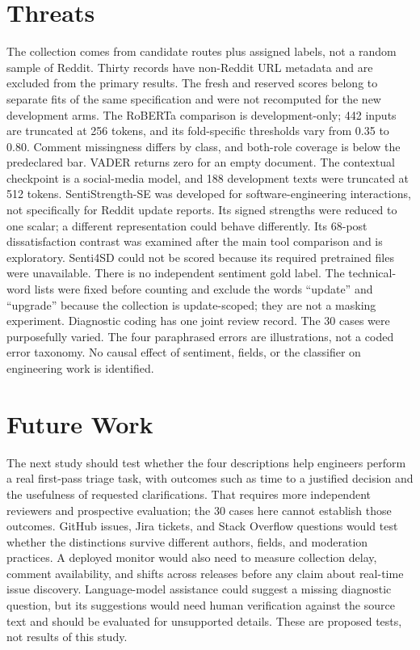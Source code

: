 \documentclass[conference,letterpaper]{IEEEtran}
\begin{document}
\section{Threats}
The collection comes from candidate routes plus assigned labels, not a random sample of Reddit. Thirty records have non-Reddit URL metadata and are excluded from the primary results. The fresh and reserved scores belong to separate fits of the same specification and were not recomputed for the new development arms. The RoBERTa comparison is development-only; 442 inputs are truncated at 256 tokens, and its fold-specific thresholds vary from 0.35 to 0.80. Comment missingness differs by class, and both-role coverage is below the predeclared bar. VADER returns zero for an empty document. The contextual checkpoint is a social-media model, and 188 development texts were truncated at 512 tokens. SentiStrength-SE was developed for software-engineering interactions, not specifically for Reddit update reports. Its signed strengths were reduced to one scalar; a different representation could behave differently. Its 68-post dissatisfaction contrast was examined after the main tool comparison and is exploratory. Senti4SD could not be scored because its required pretrained files were unavailable. There is no independent sentiment gold label. The technical-word lists were fixed before counting and exclude the words ``update'' and ``upgrade'' because the collection is update-scoped; they are not a masking experiment. Diagnostic coding has one joint review record. The 30 cases were purposefully varied. The four paraphrased errors are illustrations, not a coded error taxonomy. No causal effect of sentiment, fields, or the classifier on engineering work is identified.

\section{Future Work}
The next study should test whether the four descriptions help engineers perform a real first-pass triage task, with outcomes such as time to a justified decision and the usefulness of requested clarifications. That requires more independent reviewers and prospective evaluation; the 30 cases here cannot establish those outcomes. GitHub issues, Jira tickets, and Stack Overflow questions would test whether the distinctions survive different authors, fields, and moderation practices. A deployed monitor would also need to measure collection delay, comment availability, and shifts across releases before any claim about real-time issue discovery. Language-model assistance could suggest a missing diagnostic question, but its suggestions would need human verification against the source text and should be evaluated for unsupported details. These are proposed tests, not results of this study.
\end{document}
